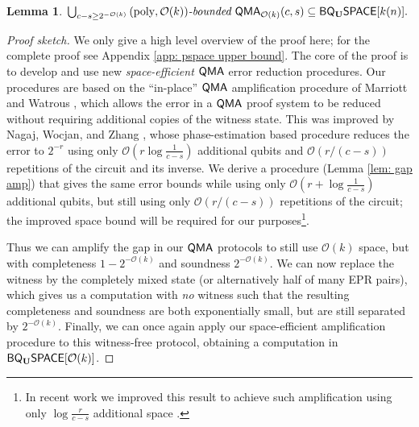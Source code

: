 \documentclass[11pt]{article}
\newtheorem{lemma}[theorem]{Lemma}
\theoremstyle{definition}
\theoremstyle{remark}
\newcommand\QMA{{\sf{QMA}}}
\newcommand\bddQMA[5]{{\left(#1,#2\right)}\textit{-bounded }\QMA_{#3}(#4,#5)}
\newcommand{\classfont}{\sf}
\newcommand{\Unitary}{\mathbf{U}}
\newcommand{\unitaryBQSPACE}[1]{{\classfont{BQ}_\Unitary\classfont{SPACE}}[#1]}
\newcommand\bigoh{\mathcal{O}}
\DeclareMathOperator{\poly}{poly}
\begin{document}
\begin{lemma} \label{lem: pspace upper bound}
$\bigcup_{c - s \ge 2^{-\bigoh(k)}}\bddQMA{\poly}{\bigoh(k)}{\bigoh(k)}{c}{s} \subseteq \unitaryBQSPACE{k(n)}.$
\end{lemma}
\begin{proof}[Proof sketch]
We only give a high level overview of the proof here; for the complete proof see Appendix \ref{app: pspace upper bound}. The core of the proof is to develop and use new {\emph{space-efficient}} $\QMA$ error reduction procedures. Our procedures are based on the ``in-place'' $\QMA$ amplification procedure of Marriott and Watrous \cite{mw05}, which allows the error in a $\QMA$ proof system to be reduced without requiring additional copies of the witness state. This was improved by Nagaj, Wocjan, and Zhang \cite{nwz11}, whose phase-estimation based procedure reduces the error to $2^{-r}$ using only $\bigoh\left(r\log{\frac{1}{c-s}}\right)$ additional qubits and $\bigoh(r/(c-s))$ repetitions of the circuit and its inverse. We derive a procedure (Lemma \ref{lem: gap amp}) that gives the same error bounds while using only $\bigoh\left(r+\log{\frac{1}{c-s}}\right)$ additional qubits, but still using only $\bigoh(r/(c-s))$ repetitions of the circuit; the improved space bound will be required for our purposes\footnote{In recent work we improved this result to achieve such amplification using only $\log{\frac{r}{c-s}}$ additional space \cite{fklmn16}.}.

Thus we can amplify the gap in our $\QMA$ protocols to still use $\bigoh(k)$ space, but with completeness $1-2^{-\bigoh(k)}$ and soundness $2^{-\bigoh(k)}$. We can now replace the witness by the completely mixed state (or alternatively half of many EPR pairs), which gives us a computation with \emph{no} witness such that the resulting completeness and soundness are both exponentially small, but are still separated by $2^{-\bigoh(k)}$. Finally, we can once again apply our space-efficient amplification procedure to this witness-free protocol, obtaining a computation in $\unitaryBQSPACE{\bigoh(k)}$.
\end{proof}
\end{document}
